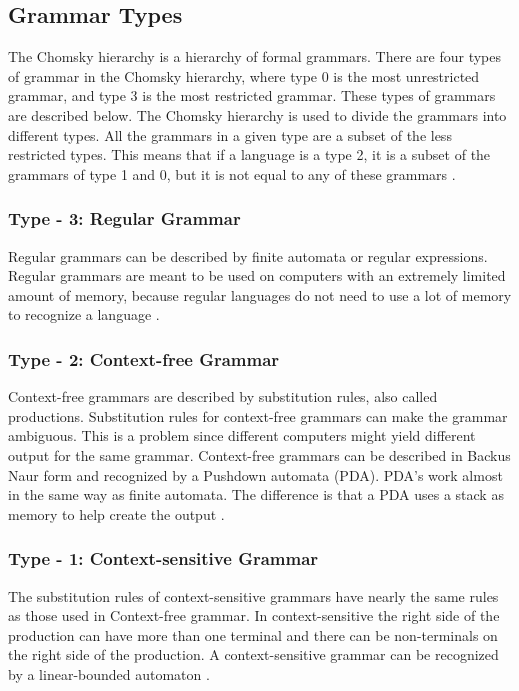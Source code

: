 \subsection{Grammar Types}
The Chomsky hierarchy is a hierarchy of formal grammars. There are four types of grammar in the Chomsky hierarchy, where type 0 is the most unrestricted grammar, and type 3 is the most restricted grammar. These types of grammars are described below. The Chomsky hierarchy is used to divide the grammars into different types. All the grammars in a given type are a subset of the less restricted types. This means that if a language is a type 2, it is a subset of the grammars of type 1 and 0, but it is not equal to any of these grammars \citep{Chomsky}.

\subsubsection{Type - 3: Regular Grammar}
Regular grammars can be described by finite automata or regular expressions. Regular grammars are meant to be used on computers with an extremely limited amount of memory, because regular languages do not need to use a lot of memory to recognize a language \citep{sipser}.

\subsubsection{Type - 2: Context-free Grammar}
Context-free grammars are described by substitution rules, also called productions. Substitution rules for context-free grammars can make the grammar ambiguous.
This is a problem since different computers might yield different output for the same grammar.
Context-free grammars can be described in Backus Naur form and recognized by a Pushdown automata (PDA). PDA's work almost in the same way as finite automata. The difference is that a PDA uses a stack as memory to help create the output \citep{sipser}. 

\subsubsection{Type - 1: Context-sensitive Grammar}
The substitution rules of context-sensitive grammars have nearly the same rules as those used in Context-free grammar. In context-sensitive the right side of the production can have more than one terminal and there can be non-terminals on the right side of the production. A context-sensitive grammar can be recognized by a linear-bounded automaton \citep{ItLatToC}.


